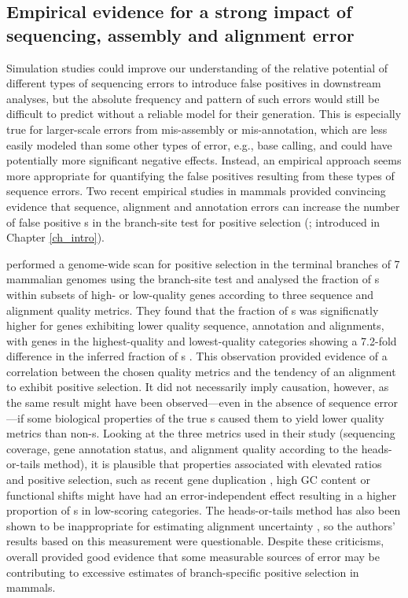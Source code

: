 \subsection{Empirical evidence for a strong impact of sequencing, assembly and alignment error}

Simulation studies could improve our understanding of the relative
potential of different types of sequencing errors to introduce false
positives in downstream analyses, but the absolute frequency and
pattern of such errors would still be difficult to predict without a
reliable model for their generation. This is especially true for
larger-scale errors from mis-assembly or mis-annotation, which are
less easily modeled than some other types of error, e.g., base
calling, and could have potentially more significant negative
effects. Instead, an empirical approach seems more appropriate for
quantifying the false positives resulting from these types of sequence
errors. Two recent empirical studies in mammals provided convincing
evidence that sequence, alignment and annotation errors can increase
the number of false positive \psg{}s in the branch-site test for
positive selection (\citet{Zhang2005}; introduced in Chapter
\ref{ch_intro}).

\citet{Schneider2009} performed a genome-wide
scan for positive selection in the terminal branches of 7 mammalian
genomes using the branch-site test and analysed the fraction of
\psg{}s within subsets of high- or low-quality genes according to
three sequence and alignment quality metrics. They found that the
fraction of \psg{}s was significnatly higher for genes exhibiting
lower quality sequence, annotation and alignments, with genes in the
highest-quality and lowest-quality categories showing a 7.2-fold
difference in the inferred fraction of \psg{}s
\citep{Schneider2009}. This observation provided evidence of a
correlation between the chosen quality metrics and the tendency of an
alignment to exhibit positive selection. It did not necessarily imply
causation, however, as the same result might have been observed---even
in the absence of sequence error---if some biological properties of
the true \psg{}s caused them to yield lower quality metrics than
non-\psg{}s. Looking at the three metrics used in their study
(sequencing coverage, gene annotation status, and alignment quality
according to the heads-or-tails method), it is plausible that
properties associated with elevated \omg ratios and positive
selection, such as recent gene duplication
\citep{Beisswanger2008,Studer2008,Casola2009}, high GC content
\citep{Ratnakumar2010} or functional shifts \citep{Storz2008,Wang2001}
might have had an error-independent effect resulting in a higher
proportion of \psg{}s in low-scoring categories. The heads-or-tails
method has also been shown to be inappropriate for estimating
alignment uncertainty \citep{Fletcher2010}, so the authors' results
based on this measurement were questionable. Despite these criticisms,
overall \citet{Schneider2009} provided good evidence that some
measurable sources of error may be contributing to excessive estimates
of branch-specific positive selection in mammals.


